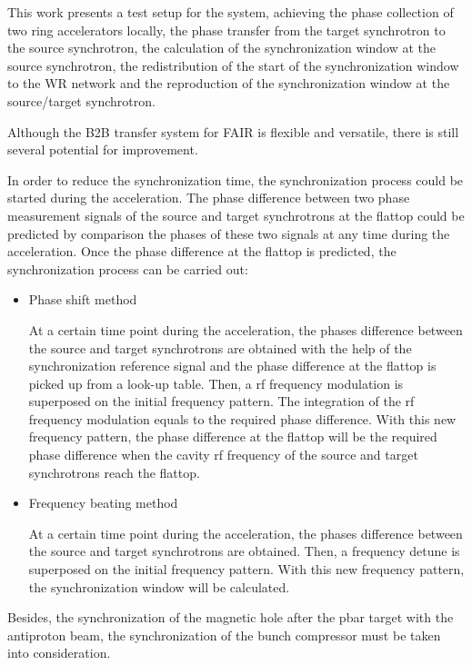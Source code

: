 This work presents a test setup for the system, achieving the phase collection of two ring accelerators locally, the phase transfer from the target synchrotron to the source synchrotron, the calculation of the synchronization window at the source synchrotron, the redistribution of the start of the synchronization window to the WR network and the reproduction of the synchronization window at the source/target synchrotron. 

Although the B2B transfer system for FAIR is flexible and versatile, there is still several potential for improvement. 

In order to reduce the synchronization time, the synchronization process could be started during the acceleration. The phase difference between two phase measurement signals of the source and target synchrotrons at the flattop could be predicted by comparison the phases of these two signals at any time during the acceleration. Once the phase difference at the flattop is predicted, the synchronization process can be carried out: 
\begin{itemize}
	\item Phase shift method

At a certain time point during the acceleration, the phases difference between the source and target synchrotrons are obtained with the help of the synchronization reference signal and the phase difference at the flattop is picked up from a look-up table. Then, a rf frequency modulation is superposed on the initial frequency pattern. The integration of the rf frequency modulation equals to the required phase difference. With this new frequency pattern, the phase difference at the flattop will be the required phase difference when the cavity rf frequency of the source and target synchrotrons reach the flattop. 
	\item Frequency beating method

At a certain time point during the acceleration, the phases difference between the source and target synchrotrons are obtained. Then, a frequency detune is superposed on the initial frequency pattern. With this new frequency pattern, the synchronization window will be calculated. 
\end{itemize}

Besides, the synchronization of the magnetic hole after the pbar target with the antiproton beam, the synchronization of the bunch compressor must be taken into consideration.